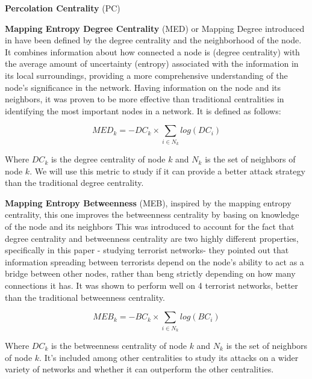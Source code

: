 \newline
\textbf{Percolation Centrality} (PC) 

\newline
\textbf{Mapping Entropy Degree Centrality} (MED) or Mapping Degree introduced in \cite{med} have been defined by the degree centrality
and the neighborhood of the node. It combines information about how connected a node is (degree centrality)
with the average amount of uncertainty (entropy) associated with the information in its local surroundings, 
providing a more comprehensive understanding of the node's significance in the network.
Having information on the node and its neighbors, it was proven to be more effective than traditional centralities
in identifying the most important nodes in a network. It is defined as follows:

\begin{equation}
    MED_k = - DC_k \times \sum_{i ∈ N_k} log(DC_i)
\end{equation}

Where $DC_k$ is the degree centrality of node $k$ and $N_k$ is the set of neighbors of node $k$.  
We will use this metric to study if it can provide a better attack strategy than the traditional degree centrality.

\newline
\textbf{Mapping Entropy Betweenness} (MEB), inspired by the mapping entropy centrality,
this one improves the betweenness centrality by basing on knowledge of the node and its neighbors \cite{meb}
This was introduced to account for the fact that degree centrality and betweenness centrality are two highly different properties,
specifically in this paper - studying terrorist networks- they pointed out that information spreading between terrorists depend on the node's
ability to act as a bridge between other nodes, rather than beng strictly depending on how many connections it has.
It was shown to perform well on 4 terrorist networks, better than the traditional betweenness centrality.


\begin{equation}
    MEB_k = - BC_k \times \sum_{i ∈ N_k} log(BC_i)
\end{equation}

Where $DC_k$ is the betweenness centrality of node $k$ and $N_k$ is the set of neighbors of node $k$.  
It's included among other centralities to study its attacks on a wider variety of networks and whether it can outperform the other centralities.

